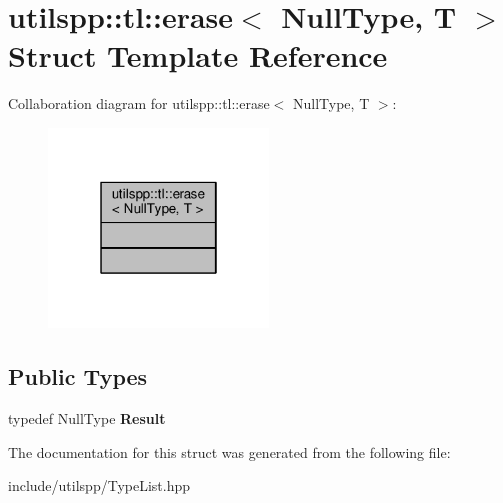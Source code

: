 \hypertarget{structutilspp_1_1tl_1_1erase_3_01NullType_00_01T_01_4}{\section{utilspp\-:\-:tl\-:\-:erase$<$ Null\-Type, T $>$ Struct Template Reference}
\label{structutilspp_1_1tl_1_1erase_3_01NullType_00_01T_01_4}
}


Collaboration diagram for utilspp\-:\-:tl\-:\-:erase$<$ Null\-Type, T $>$\-:
\nopagebreak
\begin{figure}[H]
\begin{center}
\leavevmode
\includegraphics[width=166pt]{structutilspp_1_1tl_1_1erase_3_01NullType_00_01T_01_4__coll__graph}
\end{center}
\end{figure}
\subsection*{Public Types}
\begin{DoxyCompactItemize}
\item 
\hypertarget{structutilspp_1_1tl_1_1erase_3_01NullType_00_01T_01_4_a103804ca2f41beee15f929b435584254}{typedef Null\-Type {\bfseries Result}}\label{structutilspp_1_1tl_1_1erase_3_01NullType_00_01T_01_4_a103804ca2f41beee15f929b435584254}

\end{DoxyCompactItemize}


The documentation for this struct was generated from the following file\-:\begin{DoxyCompactItemize}
\item 
include/utilspp/Type\-List.\-hpp\end{DoxyCompactItemize}
